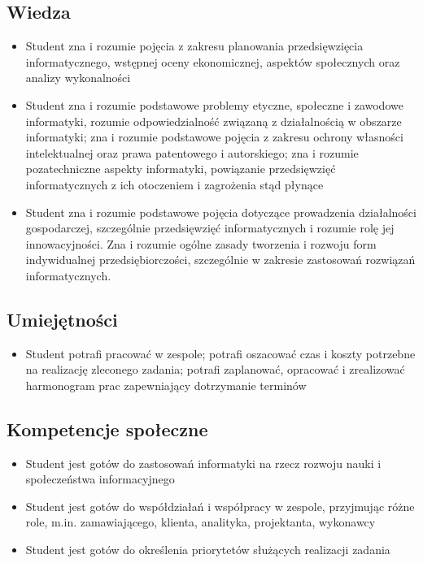 \documentclass[12pt, a4paper]{article}
\begin{document}
\subsection*{Wiedza}
\begin{itemize}
  \item Student zna i rozumie pojęcia z zakresu planowania przedsięwzięcia informatycznego, wstępnej oceny ekonomicznej, aspektów społecznych oraz analizy wykonalności
  \item Student zna i rozumie podstawowe problemy etyczne, społeczne i zawodowe informatyki, rozumie odpowiedzialność związaną z działalnością w obszarze informatyki; zna i rozumie podstawowe pojęcia z zakresu ochrony własności intelektualnej oraz prawa patentowego i autorskiego; zna i rozumie pozatechniczne aspekty informatyki, powiązanie przedsięwzięć informatycznych z ich otoczeniem i zagrożenia stąd płynące
  \item Student zna i rozumie podstawowe pojęcia dotyczące prowadzenia działalności gospodarczej, szczególnie przedsięwzięć informatycznych i rozumie rolę jej innowacyjności. Zna i rozumie ogólne zasady tworzenia i rozwoju form indywidualnej przedsiębiorczości, szczególnie w zakresie zastosowań rozwiązań informatycznych.
\end{itemize}

\subsection*{Umiejętności}
\begin{itemize}
  \item Student potrafi pracować w zespole; potrafi oszacować czas i koszty potrzebne na realizację zleconego zadania; potrafi zaplanować, opracować i zrealizować harmonogram prac zapewniający dotrzymanie terminów
\end{itemize}

\subsection*{Kompetencje społeczne}
\begin{itemize}
  \item Student jest gotów do zastosowań informatyki na rzecz rozwoju nauki i społeczeństwa informacyjnego
  \item Student jest gotów do współdziałań i współpracy w zespole, przyjmując różne role, m.in. zamawiającego, klienta, analityka, projektanta, wykonawcy
  \item Student jest gotów do określenia priorytetów służących realizacji zadania
\end{itemize}
\end{document}
